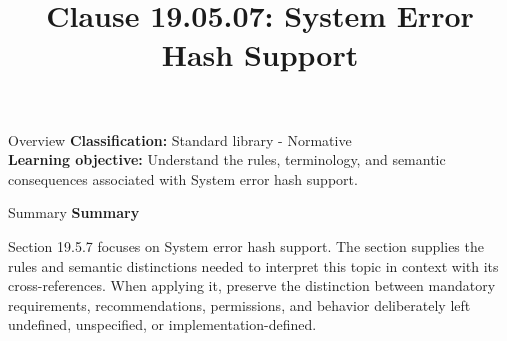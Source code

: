 \documentclass[10pt,letterpaper]{article}
\title{Clause 19.05.07: System Error Hash Support}
\author{}
\date{}
\begin{document}
\maketitle
\begin{CornellOverviewBox}{Overview}
\textbf{Classification:} Standard library - Normative\\[2pt]
\textbf{Learning objective:} Understand the rules, terminology, and semantic consequences associated with System error hash support.
\end{CornellOverviewBox}\begin{CornellSummaryBox}{Summary}
{\sffamily\bfseries\color{Accent} Summary}\par\vspace{3pt}Section 19.5.7 focuses on System error hash support. The section supplies the rules and semantic distinctions needed to interpret this topic in context with its cross-references. When applying it, preserve the distinction between mandatory requirements, recommendations, permissions, and behavior deliberately left undefined, unspecified, or implementation-defined.
\end{CornellSummaryBox}
\end{document}
